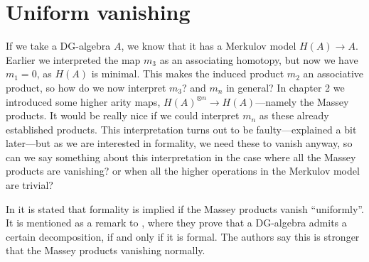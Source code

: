 \section{Uniform vanishing}




If we take a DG-algebra $A$, we know that it has a Merkulov model $H(A)\longrightarrow A$. Earlier we interpreted the map $m_3$ as an associating homotopy, but now we have $m_1 = 0$, as $H(A)$ is minimal. This makes the induced product $m_2$ an associative product, so how do we now interpret $m_3$? and $m_n$ in general? In chapter 2 we introduced some higher arity maps, $H(A)^{\otimes n}\longrightarrow H(A)$---namely the Massey products. It would be really nice if we could interpret $m_n$ as these already established products. This interpretation turns out to be faulty---explained a bit later---but as we are interested in formality, we need these to vanish anyway, so can we say something about this interpretation in the case where all the Massey products are vanishing? or when all the higher operations in the Merkulov model are trivial?

In \cite{DGMS} it is stated that formality is implied if the Massey products vanish ``uniformly''. It is mentioned as a remark to \cite[Theorem 4.1.]{DGMS}, where they prove that a DG-algebra admits a certain decomposition, if and only if it is formal. The authors say this is stronger that the Massey products vanishing normally. 




